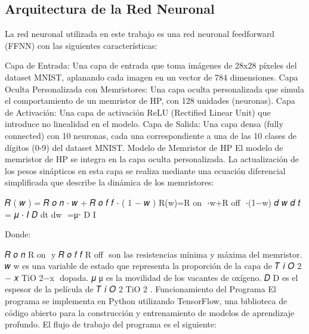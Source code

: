 \documentclass[conference]{IEEEtran}
\begin{document}
\subsection{Arquitectura de la Red Neuronal}
La red neuronal utilizada en este trabajo es una red neuronal feedforward (FFNN) con las siguientes características:

Capa de Entrada: Una capa de entrada que toma imágenes de 28x28 píxeles del dataset MNIST, aplanando cada imagen en un vector de 784 dimensiones.
Capa Oculta Personalizada con Memristores: Una capa oculta personalizada que simula el comportamiento de un memristor de HP, con 128 unidades (neuronas).
Capa de Activación: Una capa de activación ReLU (Rectified Linear Unit) que introduce no linealidad en el modelo.
Capa de Salida: Una capa densa (fully connected) con 10 neuronas, cada una correspondiente a una de las 10 clases de dígitos (0-9) del dataset MNIST.
Modelo de Memristor de HP
El modelo de memristor de HP se integra en la capa oculta personalizada. La actualización de los pesos sinápticos en esta capa se realiza mediante una ecuación diferencial simplificada que describe la dinámica de los memristores:

𝑅
(
𝑤
)
=
𝑅
𝑜
𝑛
⋅
𝑤
+
𝑅
𝑜
𝑓
𝑓
⋅
(
1
−
𝑤
)
R(w)=R 
on
​
⋅w+R 
off
​
⋅(1−w)
𝑑
𝑤
𝑑
𝑡
=
𝜇
⋅
𝐼
𝐷
dt
dw
​
=μ⋅ 
D
I
​


Donde:

𝑅
𝑜
𝑛
R 
on
​
y 
𝑅
𝑜
𝑓
𝑓
R 
off
​
son las resistencias mínima y máxima del memristor.
𝑤
w es una variable de estado que representa la proporción de la capa de 
𝑇
𝑖
𝑂
2
−
𝑥
TiO 
2−x
​
dopada.
𝜇
μ es la movilidad de los vacantes de oxígeno.
𝐷
D es el espesor de la película de 
𝑇
𝑖
𝑂
2
TiO 
2
​
.
Funcionamiento del Programa
El programa se implementa en Python utilizando TensorFlow, una biblioteca de código abierto para la construcción y entrenamiento de modelos de aprendizaje profundo. El flujo de trabajo del programa es el siguiente:
\end{document}
